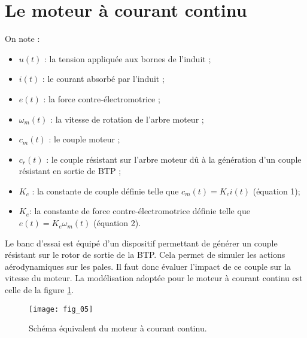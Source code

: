 \section*{Le moteur à courant continu}
\ifprof
\else

On note :
\begin{itemize}
	\item $u(t)$ : la tension appliquée aux bornes de l'induit ;
	\item $i(t)$ : le courant absorbé par l'induit ;
	\item $e(t)$ : la force contre-électromotrice ;
	\item $\omega_m (t)$ : la vitesse de rotation de l'arbre moteur ;
	\item $c_m (t)$ : le couple moteur ;
	\item $c_r (t)$ : le couple résistant sur l'arbre moteur dû à la génération d'un couple résistant en sortie de BTP ;
	\item $K_c$ : la constante de couple définie telle que
 $c_m (t)=K_c i(t)$	(équation 1);
	\item $K_e$: la constante de force contre-électromotrice définie telle que $e(t)=K_e \omega_m (t)$	(équation 2).
	\end{itemize}


Le banc d'essai est équipé d'un dispositif permettant de générer un couple résistant sur le rotor de sortie de la BTP. Cela permet de simuler les actions aérodynamiques sur les pales. Il faut donc évaluer l'impact de ce couple sur la vitesse du moteur. 
La modélisation adoptée pour le moteur à courant continu est celle de la figure \ref{btp_fig_05}.
 

\begin{figure}[!h]
\centering
\texttt{[image: fig\_05]}

\caption{Schéma équivalent du moteur à courant continu.}

\label{btp_fig_05}
\end{figure}




